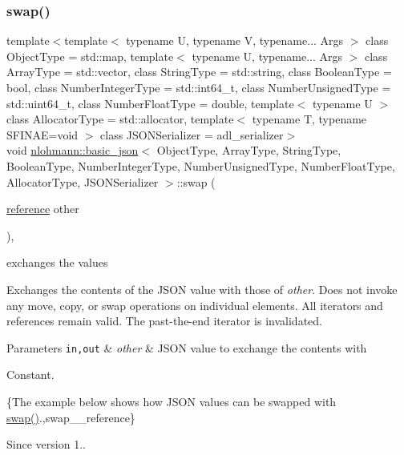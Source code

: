 \subsubsection{\texorpdfstring{swap()}{swap()}\hspace{0.1cm}{\footnotesize\ttfamily [1/4]}}
{\footnotesize\ttfamily template$<$template$<$ typename U, typename V, typename... Args $>$ class Object\+Type = std\+::map, template$<$ typename U, typename... Args $>$ class Array\+Type = std\+::vector, class String\+Type  = std\+::string, class Boolean\+Type  = bool, class Number\+Integer\+Type  = std\+::int64\+\_\+t, class Number\+Unsigned\+Type  = std\+::uint64\+\_\+t, class Number\+Float\+Type  = double, template$<$ typename U $>$ class Allocator\+Type = std\+::allocator, template$<$ typename T, typename S\+F\+I\+N\+A\+E=void $>$ class J\+S\+O\+N\+Serializer = adl\+\_\+serializer$>$ \\
void \mbox{\hyperlink{classnlohmann_1_1basic__json}{nlohmann\+::basic\+\_\+json}}$<$ Object\+Type, Array\+Type, String\+Type, Boolean\+Type, Number\+Integer\+Type, Number\+Unsigned\+Type, Number\+Float\+Type, Allocator\+Type, J\+S\+O\+N\+Serializer $>$\+::swap (\begin{DoxyParamCaption}\item[{\mbox{\hyperlink{classnlohmann_1_1basic__json_ac6a5eddd156c776ac75ff54cfe54a5bc}{reference}}}]{other }\end{DoxyParamCaption})\hspace{0.3cm}{\ttfamily [inline]}, {\ttfamily [noexcept]}}



exchanges the values 

Exchanges the contents of the J\+S\+ON value with those of {\itshape other}. Does not invoke any move, copy, or swap operations on individual elements. All iterators and references remain valid. The past-\/the-\/end iterator is invalidated.


\begin{DoxyParams}[1]{Parameters}
\mbox{\tt in,out}  & {\em other} & J\+S\+ON value to exchange the contents with\\
\hline
\end{DoxyParams}
Constant.

\{The example below shows how J\+S\+ON values can be swapped with {\ttfamily \mbox{\hyperlink{classnlohmann_1_1basic__json_a8c9d932353e1ab98a7dc2fc27e002031}{swap()}}}.,swap\+\_\+\+\_\+reference\}

\begin{DoxySince}{Since}
version 1.. 
\end{DoxySince}
\mbox{\label{classnlohmann_1_1basic__json_a65b0a24e1361a030ad0a661de22f6c8e}} 
